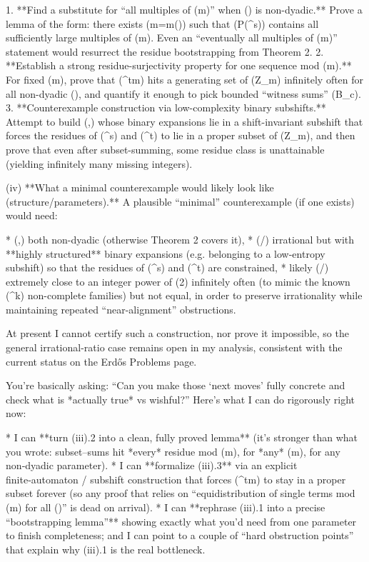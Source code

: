 1. **Find a substitute for “all multiples of (m)” when (\alpha) is non-dyadic.**
   Prove a lemma of the form: there exists (m=m(\alpha)) such that (P({^s\alpha\rfloor})) contains all sufficiently large multiples of (m). Even an “eventually all multiples of (m)” statement would resurrect the residue bootstrapping from Theorem 2.
2. **Establish a strong residue-surjectivity property for one sequence mod (m).**
   For fixed (m), prove that ({^t\beta\rfloor\bmod m}) hits a generating set of (\mathbb Z_m) infinitely often for all non-dyadic (\beta), and quantify it enough to pick bounded “witness sums” (B_c).
3. **Counterexample construction via low-complexity binary subshifts.**
   Attempt to build (\alpha,\beta) whose binary expansions lie in a shift-invariant subshift that forces the residues of (^s\alpha\rfloor) and (^t\beta\rfloor) to lie in a proper subset of (\mathbb Z_m), and then prove that even after subset-summing, some residue class is unattainable (yielding infinitely many missing integers).

(iv) **What a minimal counterexample would likely look like (structure/parameters).**
A plausible “minimal” counterexample (if one exists) would need:

* (\alpha,\beta) both non-dyadic (otherwise Theorem 2 covers it),
* (\alpha/\beta) irrational but with **highly structured** binary expansions (e.g. belonging to a low-entropy subshift) so that the residues of (^s\alpha\rfloor) and (^t\beta\rfloor) are constrained,
* likely (\beta/\alpha) extremely close to an integer power of (2) infinitely often (to mimic the known (^k\alpha) non-complete families) but not equal, in order to preserve irrationality while maintaining repeated “near-alignment” obstructions.

At present I cannot certify such a construction, nor prove it impossible, so the general irrational-ratio case remains open in my analysis, consistent with the current status on the Erdős Problems page.

You’re basically asking: “Can you make those ‘next moves’ fully concrete and check what is *actually true* vs wishful?” Here’s what I can do rigorously right now:

* I can **turn (iii).2 into a clean, fully proved lemma** (it’s stronger than what you wrote: subset–sums hit *every* residue mod (m), for *any* (m), for any non‑dyadic parameter).
* I can **formalize (iii).3** via an explicit finite‑automaton / subshift construction that forces (^t\beta\rfloor\bmod m) to stay in a proper subset forever (so any proof that relies on “equidistribution of single terms mod (m) for all (\beta)” is dead on arrival).
* I can **rephrase (iii).1 into a precise “bootstrapping lemma”** showing exactly what you’d need from one parameter to finish completeness; and I can point to a couple of “hard obstruction points” that explain why (iii).1 is the real bottleneck.

